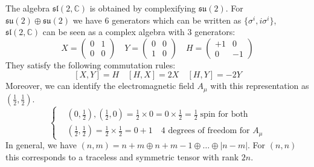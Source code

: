 \documentclass[../main.tex]{subfiles}
\begin{document}
The algebra $\mathfrak{sl}(2,\mathbb{C})$ is obtained by complexifying $\mathfrak{su}(2)$. For $\mathfrak{su}(2)\oplus\mathfrak{su}(2)$ we have 6 generators which can be written as $\{\sigma^i,i\sigma^i\}$, $\mathfrak{sl}(2,\mathbb{C})$ can be seen as a complex algebra with 3 generators:
\[
X=\left(\begin{array}{cc}
    0 & 1 \\
    0 & 0
\end{array}\right)
\quad
Y=\left(\begin{array}{cc}
    0 & 0 \\
    1 & 0
\end{array}\right)
\quad
H=\left(\begin{array}{cc}
    +1 & 0 \\
    0 & -1
\end{array}\right)
\]
They satisfy the following commutation rules:
\[
[X,Y]=H \quad [H,X]=2X \quad [H,Y]=-2Y
\]
Moreover, we can identify the electromagnetic field $A_\mu$ with this representation as $(\frac{1}{2},\frac{1}{2})$.
\[
\left\{
\begin{aligned}
&(0,\frac{1}{2}), (\frac{1}{2},0)=\frac{1}{2}\times0=0\times\frac{1}{2}=\frac{1}{2}\;\text{spin for both}\\
&(\frac{1}{2},\frac{1}{2})=\frac{1}{2}\times\frac{1}{2}=0+1\quad\text{4 degrees of freedom for $A_\mu$}
\end{aligned}
\right.
\]
In general, we have $(n,m)=n+m\oplus n+m-1\oplus\dots\oplus|n-m|$. For $(n,n)$ this corresponds to a traceless and symmetric tensor with rank $2n$.
\end{document}
